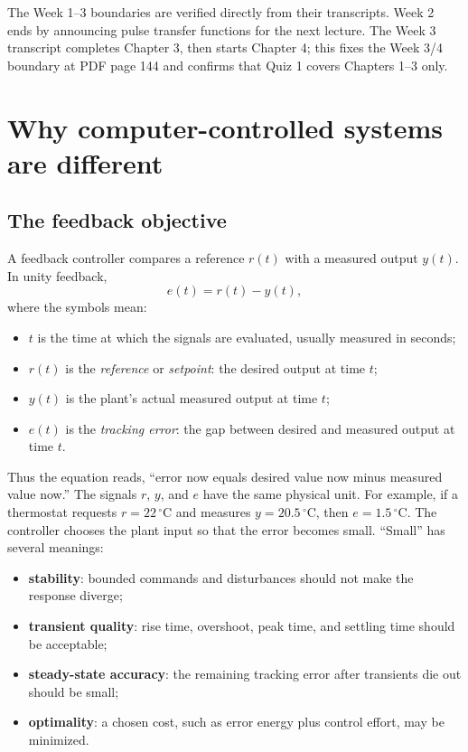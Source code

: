 \documentclass[11pt]{article}
\newcommand{\weeklabel}[1]{\par\smallskip\noindent{\color{blue!60!black}\textbf{Taught in #1.}}\par\smallskip}
\begin{document}
The Week 1--3 boundaries are verified directly from their transcripts. Week 2 ends by announcing pulse transfer functions for the next lecture. The Week 3 transcript completes Chapter 3, then starts Chapter 4; this fixes the Week 3/4 boundary at PDF page 144 and confirms that Quiz 1 covers Chapters 1--3 only.

\section{Why computer-controlled systems are different}

\weeklabel{Week 1}

\subsection{The feedback objective}

A feedback controller compares a reference $r(t)$ with a measured output $y(t)$. In unity feedback,
\[
e(t)=r(t)-y(t),
\]
where the symbols mean:
\begin{itemize}
  \item $t$ is the time at which the signals are evaluated, usually measured in seconds;
  \item $r(t)$ is the \emph{reference} or \emph{setpoint}: the desired output at time $t$;
  \item $y(t)$ is the plant's actual measured output at time $t$;
  \item $e(t)$ is the \emph{tracking error}: the gap between desired and measured output at time $t$.
\end{itemize}
Thus the equation reads, ``error now equals desired value now minus measured value now.'' The signals $r$, $y$, and $e$ have the same physical unit. For example, if a thermostat requests $r=22\,{}^\circ\mathrm{C}$ and measures $y=20.5\,{}^\circ\mathrm{C}$, then $e=1.5\,{}^\circ\mathrm{C}$. The controller chooses the plant input so that the error becomes small. ``Small'' has several meanings:
\begin{itemize}
  \item \textbf{stability}: bounded commands and disturbances should not make the response diverge;
  \item \textbf{transient quality}: rise time, overshoot, peak time, and settling time should be acceptable;
  \item \textbf{steady-state accuracy}: the remaining tracking error after transients die out should be small;
  \item \textbf{optimality}: a chosen cost, such as error energy plus control effort, may be minimized.
\end{itemize}
\end{document}
